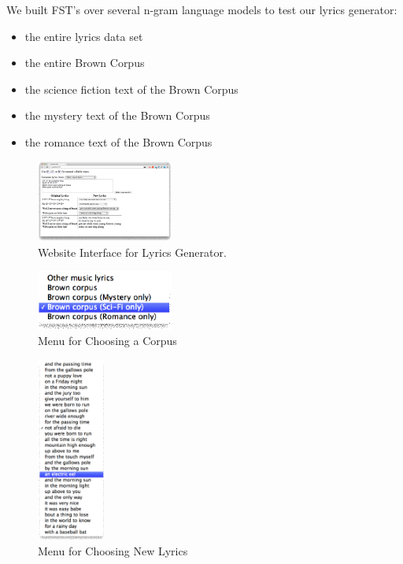 \documentclass{vgtc}                          %
\begin{document}
We built FST's over several n-gram language models to test our lyrics generator:
\begin{itemize}
  \item the entire lyrics data set
  \item the entire Brown Corpus
  \item the science fiction text of the Brown Corpus
  \item the mystery text of the Brown Corpus
  \item the romance text of the Brown Corpus
\end{itemize}


\begin{figure}%
\centering
\includegraphics[width=0.4\textwidth]{images/eps/lion_king2.eps}
\caption{Website Interface for Lyrics Generator.}
\label{fig:interface}
\end{figure}

\begin{figure}%
\centering
\includegraphics[width=0.4\textwidth]{images/eps/choose_corpus.eps}
\caption{Menu for Choosing a Corpus}
\label{fig:corpus-menu}
\end{figure}

\begin{figure}%
\centering
\includegraphics[width=0.2\textwidth]{images/eps/choose_lyrics_menu.eps}
\caption{Menu for Choosing New Lyrics}
\label{fig:lyrics-menu}
\end{figure}
\end{document}
